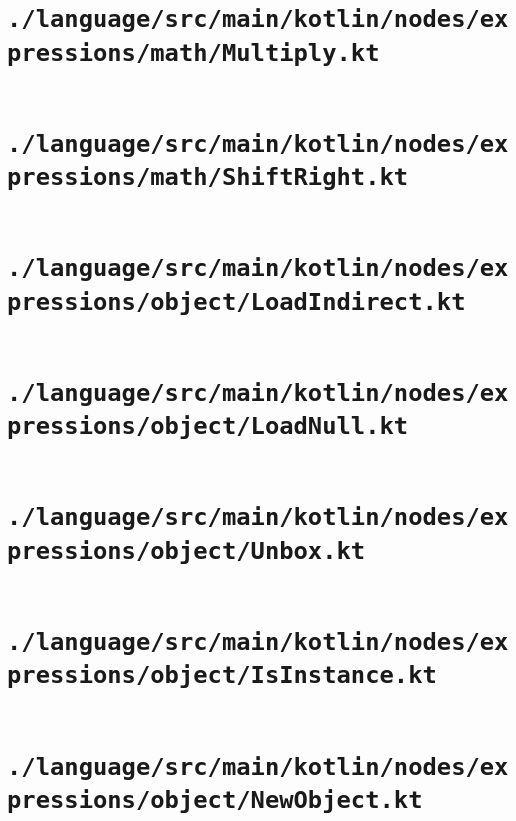 \documentclass[a4paper, 11pt]{report}
\begin{document}
    \section{\lstinline{./language/src/main/kotlin/nodes/expressions/math/Multiply.kt}}
    \inputminted{kotlin}{./language/src/main/kotlin/nodes/expressions/math/Multiply.kt}


    \section{\lstinline{./language/src/main/kotlin/nodes/expressions/math/ShiftRight.kt}}
    \inputminted{kotlin}{./language/src/main/kotlin/nodes/expressions/math/ShiftRight.kt}


    \section{\lstinline{./language/src/main/kotlin/nodes/expressions/object/LoadIndirect.kt}}
    \inputminted{kotlin}{./language/src/main/kotlin/nodes/expressions/object/LoadIndirect.kt}


    \section{\lstinline{./language/src/main/kotlin/nodes/expressions/object/LoadNull.kt}}
    \inputminted{kotlin}{./language/src/main/kotlin/nodes/expressions/object/LoadNull.kt}


    \section{\lstinline{./language/src/main/kotlin/nodes/expressions/object/Unbox.kt}}
    \inputminted{kotlin}{./language/src/main/kotlin/nodes/expressions/object/Unbox.kt}


    \section{\lstinline{./language/src/main/kotlin/nodes/expressions/object/IsInstance.kt}}
    \inputminted{kotlin}{./language/src/main/kotlin/nodes/expressions/object/IsInstance.kt}


    \section{\lstinline{./language/src/main/kotlin/nodes/expressions/object/NewObject.kt}}
    \inputminted{kotlin}{./language/src/main/kotlin/nodes/expressions/object/NewObject.kt}
\end{document}
